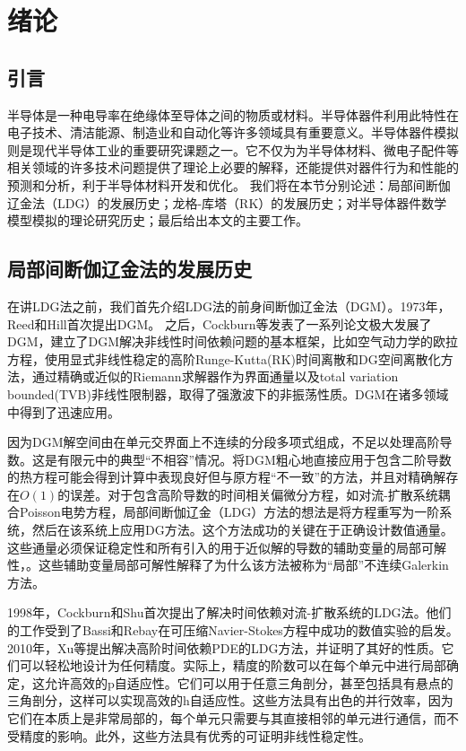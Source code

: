 \cleardoublepage

\section{绪论}

\subsection{引言}
半导体是一种电导率在绝缘体至导体之间的物质或材料。半导体器件利用此特性在电子技术、清洁能源、制造业和自动化等许多领域具有重要意义。半导体器件模拟则是现代半导体工业的重要研究课题之一。它不仅为为半导体材料、微电子配件等相关领域的许多技术问题提供了理论上必要的解释，还能提供对器件行为和性能的预测和分析，利于半导体材料开发和优化。
我们将在本节分别论述：局部间断伽辽金法（LDG）的发展历史；龙格-库塔（RK）的发展历史；对半导体器件数学模型模拟的理论研究历史；最后给出本文的主要工作。
\subsection{局部间断伽辽金法的发展历史}
在讲LDG法之前，我们首先介绍LDG法的前身间断伽辽金法（DGM）。1973年，Reed和Hill首次提出DGM\cite{reed1973triangular}。
之后，Cockburn等发表了一系列论文极大发展了DGM，建立了DGM解决非线性时间依赖问题的基本框架\cite{reed1973triangular,cockburn1991runge,cockburn1989tvb2,cockburn1989tvb3,cockburn1990runge,cockburn1998runge}，比如空气动力学的欧拉方程，使用显式非线性稳定的高阶Runge-Kutta(RK)时间离散和DG空间离散化方法，通过精确或近似的Riemann求解器作为界面通量以及total variation bounded(TVB)非线性限制器，取得了强激波下的非振荡性质。DGM在诸多领域中得到了迅速应用\cite{cockburn2000development}。

因为DGM解空间由在单元交界面上不连续的分段多项式组成，不足以处理高阶导数。这是有限元中的典型“不相容”情况。将DGM粗心地直接应用于包含二阶导数的热方程可能会得到计算中表现良好但与原方程“不一致”的方法，并且对精确解存在$O(1)$的误差\cite{cockburn2001runge,zhang2003analysis}。对于包含高阶导数的时间相关偏微分方程，如对流-扩散系统耦合Poisson电势方程，局部间断伽辽金（LDG）方法的想法是将方程重写为一阶系统，然后在该系统上应用DG方法。这个方法成功的关键在于正确设计数值通量。这些通量必须保证稳定性和所有引入的用于近似解的导数的辅助变量的局部可解性，。这些辅助变量局部可解性解释了为什么该方法被称为“局部”不连续Galerkin方法\cite{cockburn1998local}。

1998年，Cockburn和Shu首次提出了解决时间依赖对流-扩散系统的LDG法\cite{cockburn1998local}。他们的工作受到了Bassi和Rebay在可压缩Navier-Stokes方程中成功的数值实验的启发\cite{bassi1997high}。2010年，Xu等提出解决高阶时间依赖PDE的LDG方法\cite{xu2010local}，并证明了其好的性质。它们可以轻松地设计为任何精度。实际上，精度的阶数可以在每个单元中进行局部确定，这允许高效的p自适应性。它们可以用于任意三角剖分，甚至包括具有悬点的三角剖分，这样可以实现高效的h自适应性。这些方法具有出色的并行效率，因为它们在本质上是非常局部的，每个单元只需要与其直接相邻的单元进行通信，而不受精度的影响。此外，这些方法具有优秀的可证明非线性稳定性。
